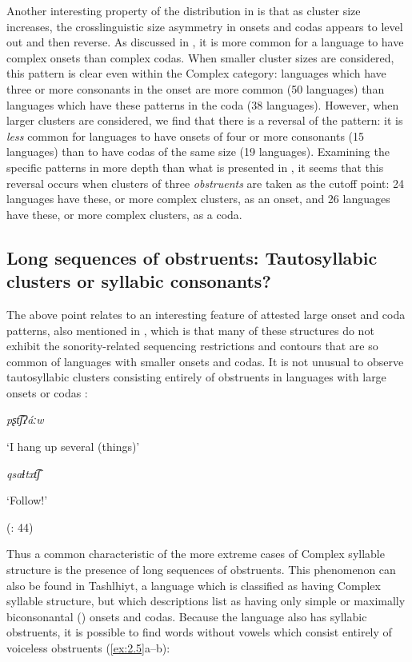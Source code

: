   Another interesting property of the distribution in  is that as cluster size increases, the crosslinguistic size asymmetry in onsets and codas appears to level out and then reverse. As discussed in , it is more common for a language to have complex onsets than complex codas. When smaller cluster sizes are considered, this pattern is clear even within the Complex category: languages which have three or more consonants in the onset are more common (50 languages) than languages which have these patterns in the coda (38 languages). However, when larger clusters are considered, we find that there is a reversal of the pattern: it is \textit{less} common for languages to have onsets of four or more consonants (15 languages) than to have codas of the same size (19 languages). Examining the specific patterns in more depth than what is presented in , it seems that this reversal occurs when clusters of three \textit{obstruents} are taken as the cutoff point: 24 languages have these, or more complex clusters, as an onset, and 26 languages have these, or more complex clusters, as a coda.

\subsection{Long sequences of obstruents: Tautosyllabic clusters or syllabic consonants?}\label{sec:2.2.1}

  The above point relates to an interesting feature of attested large onset and coda patterns, also mentioned in , which is that many of these structures do not exhibit the sonority-related sequencing restrictions and contours that are so common of languages with smaller onsets and codas. It is not unusual to observe tautosyllabic clusters consisting entirely of obstruents in languages with large onsets or codas :

\ea\label{ex:2.3}

  \textit{pʂt͡ʃʔáːw}

  ‘I hang up several (things)’

  \citep[36]{Crawford1966}
\z

\ea\label{ex:2.4}

  \textit{qsaɬtxt͡ʃ}

  ‘Follow!’

  (\citealt{GeorgVolodin1999}: 44)
\z

  Thus a common characteristic of the more extreme cases of Complex syllable structure is the presence of long sequences of obstruents. This phenomenon can also be found in Tashlhiyt, a language which is classified as having Complex syllable structure, but which descriptions list as having only simple \citep{Ridouane2008} or maximally biconsonantal (\citealt{PuechLouali1999}) onsets and codas. Because the language also has syllabic obstruents, it is possible to find words without vowels which consist entirely of voiceless obstruents (\ref{ex:2.5}a--b):

